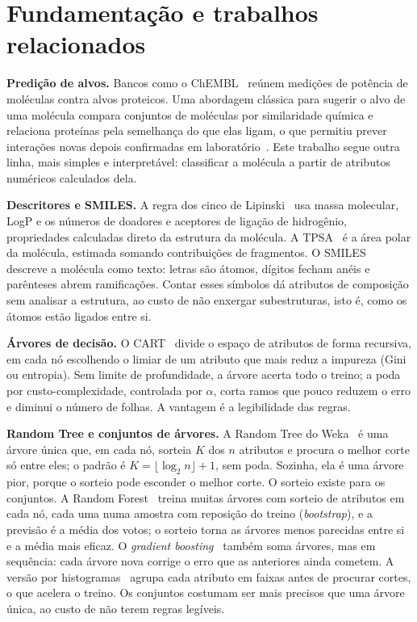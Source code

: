 \section{Fundamentação e trabalhos relacionados}

\textbf{Predição de alvos.} Bancos como o ChEMBL~\cite{gaulton:12,zdrazil:24} reúnem medições de potência de moléculas contra alvos proteicos. Uma abordagem clássica para sugerir o alvo de uma molécula compara conjuntos de moléculas por similaridade química e relaciona proteínas pela semelhança do que elas ligam, o que permitiu prever interações novas depois confirmadas em laboratório~\cite{keiser:07}. Este trabalho segue outra linha, mais simples e interpretável: classificar a molécula a partir de atributos numéricos calculados dela.

\textbf{Descritores e SMILES.} A regra dos cinco de Lipinski~\cite{lipinski:01} usa massa molecular, LogP e os números de doadores e aceptores de ligação de hidrogênio, propriedades calculadas direto da estrutura da molécula. A TPSA~\cite{ertl:00} é a área polar da molécula, estimada somando contribuições de fragmentos. O SMILES~\cite{weininger:88} descreve a molécula como texto: letras são átomos, dígitos fecham anéis e parênteses abrem ramificações. Contar esses símbolos dá atributos de composição sem analisar a estrutura, ao custo de não enxergar subestruturas, isto é, como os átomos estão ligados entre si.

\textbf{Árvores de decisão.} O CART~\cite{breiman:84} divide o espaço de atributos de forma recursiva, em cada nó escolhendo o limiar de um atributo que mais reduz a impureza (Gini ou entropia). Sem limite de profundidade, a árvore acerta todo o treino; a poda por custo-complexidade, controlada por $\alpha$, corta ramos que pouco reduzem o erro e diminui o número de folhas. A vantagem é a legibilidade das regras.

\textbf{Random Tree e conjuntos de árvores.} A Random Tree do Weka~\cite{witten:16} é uma árvore única que, em cada nó, sorteia $K$ dos $n$ atributos e procura o melhor corte só entre eles; o padrão é $K = \lfloor \log_2 n \rfloor + 1$, sem poda. Sozinha, ela é uma árvore pior, porque o sorteio pode esconder o melhor corte. O sorteio existe para os conjuntos. A Random Forest~\cite{breiman:01} treina muitas árvores com sorteio de atributos em cada nó, cada uma numa amostra com reposição do treino (\emph{bootstrap}), e a previsão é a média dos votos; o sorteio torna as árvores menos parecidas entre si e a média mais eficaz. O \emph{gradient boosting}~\cite{friedman:01} também soma árvores, mas em sequência: cada árvore nova corrige o erro que as anteriores ainda cometem. A versão por histogramas~\cite{ke:17} agrupa cada atributo em faixas antes de procurar cortes, o que acelera o treino. Os conjuntos costumam ser mais precisos que uma árvore única, ao custo de não terem regras legíveis.

